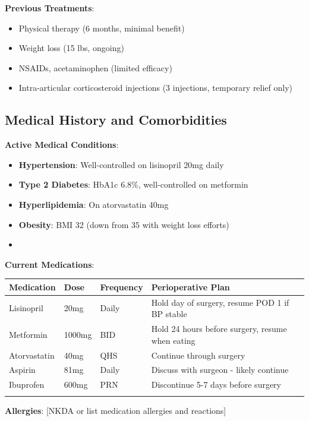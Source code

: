 \documentclass[11pt,letterpaper]{article}
\begin{document}
\textbf{Previous Treatments}:
\begin{itemize}[leftmargin=*]
    \item Physical therapy (6 months, minimal benefit)
    \item Weight loss (15 lbs, ongoing)
    \item NSAIDs, acetaminophen (limited efficacy)
    \item Intra-articular corticosteroid injections (3 injections, temporary relief only)
\end{itemize}

\subsection*{Medical History and Comorbidities}

\textbf{Active Medical Conditions}:
\begin{itemize}[leftmargin=*]
    \item \textbf{Hypertension}: Well-controlled on lisinopril 20mg daily
    \item \textbf{Type 2 Diabetes}: HbA1c 6.8\%, well-controlled on metformin
    \item \textbf{Hyperlipidemia}: On atorvastatin 40mg
    \item \textbf{Obesity}: BMI 32 (down from 35 with weight loss efforts)
    \item [List additional conditions]
\end{itemize}

\textbf{Current Medications}:
\begin{longtable}{|p{3cm}|p{2cm}|p{2cm}|p{6cm}|}
\hline
\textbf{Medication} & \textbf{Dose} & \textbf{Frequency} & \textbf{Perioperative Plan} \\ \hline
Lisinopril & 20mg & Daily & Hold day of surgery, resume POD 1 if BP stable \\ \hline
Metformin & 1000mg & BID & Hold 24 hours before surgery, resume when eating \\ \hline
Atorvastatin & 40mg & QHS & Continue through surgery \\ \hline
Aspirin & 81mg & Daily & Discuss with surgeon - likely continue \\ \hline
Ibuprofen & 600mg & PRN & Discontinue 5-7 days before surgery \\ \hline
[Add medications] & & & \\ \hline
\end{longtable}

\textbf{Allergies}: [NKDA or list medication allergies and reactions]
\end{document}
